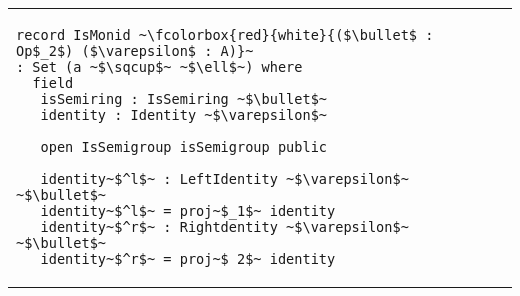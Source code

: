 \begin{adjustbox}{width=1.2\columnwidth,center}
\begin{tabular}{p{7cm} p{7cm} p{7cm}}
\begin{verbatim}
record IsMonid ~\fcolorbox{red}{white}{($\bullet$ : Op$_2$) ($\varepsilon$ : A)}~ 
: Set (a ~$\sqcup$~ ~$\ell$~) where 
  field 
   isSemiring : IsSemiring ~$\bullet$~ 
   identity : Identity ~$\varepsilon$~ 
       
   open IsSemigroup isSemigroup public 
   
   identity~$^l$~ : LeftIdentity ~$\varepsilon$~ ~$\bullet$~ 
   identity~$^l$~ = proj~$_1$~ identity 
   identity~$^r$~ : Rightdentity ~$\varepsilon$~ ~$\bullet$~ 
   identity~$^r$~ = proj~$_2$~ identity        
\end{verbatim}       
\end{tabular}  
\end{adjustbox}
